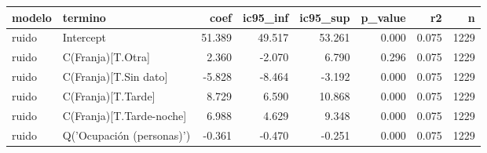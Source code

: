 \begin{tabular}{llrrrrrr}
\toprule
modelo & termino & coef & ic95\_inf & ic95\_sup & p\_value & r2 & n \\
\midrule
ruido & Intercept & 51.389 & 49.517 & 53.261 & 0.000 & 0.075 & 1229 \\
ruido & C(Franja)[T.Otra] & 2.360 & -2.070 & 6.790 & 0.296 & 0.075 & 1229 \\
ruido & C(Franja)[T.Sin dato] & -5.828 & -8.464 & -3.192 & 0.000 & 0.075 & 1229 \\
ruido & C(Franja)[T.Tarde] & 8.729 & 6.590 & 10.868 & 0.000 & 0.075 & 1229 \\
ruido & C(Franja)[T.Tarde-noche] & 6.988 & 4.629 & 9.348 & 0.000 & 0.075 & 1229 \\
ruido & Q('Ocupación (personas)') & -0.361 & -0.470 & -0.251 & 0.000 & 0.075 & 1229 \\
\bottomrule
\end{tabular}
